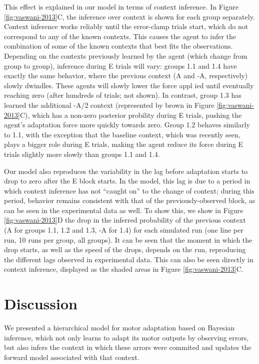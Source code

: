 \documentclass[a4paper,doc,floatsintext,natbib]{apa6}
\def \fref #1{Figure \ref{#1}}     %
\begin{document}
This effect is explained in our model in terms of context inference. In \fref{fig:vaswani-2013}C, the inference over context is shown for each group separately. Context inference works reliably until the error-clamp trials start, which do not correspond to any of the known contexts. This causes the agent to infer the combination of some of the known contexts that best fits the observations. Depending on the contexts previously learned by the agent (which change from group to group), inference during E trials will vary: groups 1.1 and 1.4 have exactly the same behavior, where the previous context (A and -A, respectively) slowly dwindles. These agents will slowly lower the force appl ied until eventually reaching zero (after hundreds of trials; not shown). In contrast, group 1.3 has learned the additional -A/2 context (represented by brown in \fref{fig:vaswani-2013}C), which has a non-zero posterior probility during E trials, pushing the agent's adaptation force more quickly towards zero. Group 1.2 behaves similarly to 1.1, with the exception that the baseline context, which was recently seen, plays a bigger role during E trials, making the agent reduce its force during E trials slightly more slowly than groups 1.1 and 1.4.

Our model also reproduces the variability in the lag before adaptation starts to drop to zero after the E block starts. In the model, this lag is due to a period in which context inference has not ``caught on'' to the change of context; during this period, behavior remains consistent with that of the previously-observed block, as can be seen in the experimental data as well. To show this, we show in \fref{fig:vaswani-2013}D the drop in the inferred probability of the previous context (A for groups 1.1, 1.2 and 1.3, -A for 1.4) for each simulated run (one line per run, 10 runs per group, all groups). It can be seen that the moment in which the drop starts, as well as the speed of the drops, depends on the run, reproducing the different lags observed in experimental data. This can also be seen directly in context inference, displayed as the shaded areas in \fref{fig:vaswani-2013}C.


\section{Discussion}
We presented a hierarchical model for motor adaptation based on Bayesian inference, which not only learns to adapt its motor outputs by observing errors, but also infers the context in which these arrors were commited and updates the forward model associated with that context.
\end{document}
